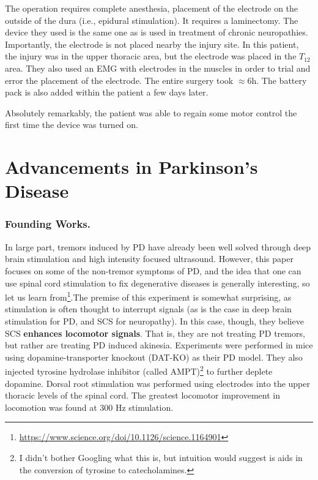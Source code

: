 The operation requires complete anesthesia, placement of the electrode on the outside of the dura (i.e., epidural stimulation). It requires a laminectomy. The device they used is the same one as is used in treatment of chronic neuropathies. Importantly, the electrode is not placed nearby the injury site. In this patient, the injury was in the upper thoracic area, but the electrode was placed in the $T_{12}$ area. They also used an EMG with electrodes in the muscles in order to trial and error the placement of the electrode. The entire surgery took $\approx 6$h. The battery pack is also added within the patient a few days later.\newline

Absolutely remarkably, the patient was able to regain some motor control the first time the device was turned on. 

\section{Advancements in Parkinson's Disease}

\subsubsection{Founding Works.}

In large part, tremors induced by PD have already been well solved through deep brain stimulation and high intensity focused ultrasound. However, this paper focuses on some of the non-tremor symptoms of PD, and the idea that one can use spinal cord stimulation to fix degenerative diseases is generally interesting, so let us learn from\footnote{\url{https://www.science.org/doi/10.1126/science.1164901}}.The premise of this experiment is somewhat surprising, as stimulation is often thought to interrupt signals (as is the case in deep brain stimulation for PD, and SCS for neuropathy). In this case, though, they believe SCS \textbf{enhances locomotor signals}. That is, they are not treating PD tremors, but rather are treating PD induced akinesia. Experiments were performed in mice using dopamine-transporter knockout (DAT-KO) as their PD model. They also injected tyrosine hydrolase inhibitor (called AMPT)\footnote{I didn't bother Googling what this is, but intuition would suggest is aids in the conversion of tyrosine to catecholamines.} to further deplete dopamine. Dorsal root stimulation was performed using electrodes into the upper thoracic levels of the spinal cord. The greatest locomotor improvement in locomotion was found at 300 Hz stimulation.\newline

